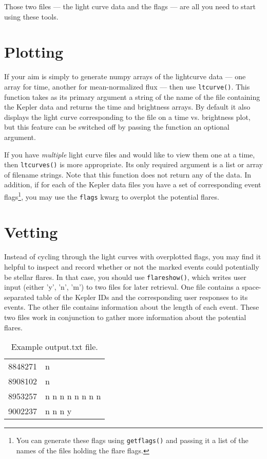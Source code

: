 \documentclass{article}
\begin{document}
Those two files --- the light curve data and the flags --- are all you
need to start using these tools.


\section{Plotting}
\label{sec:basic}

If your aim is simply to generate numpy arrays of the lightcurve data
--- one array for time, another for mean-normalized flux --- then use
\verb|ltcurve()|.  This function takes as its primary argument a
string of the name of the file containing the Kepler data and returns
the time and brightness arrays.  By default it also displays the light
curve corresponding to the file on a time vs. brightness plot, but
this feature can be switched off by passing the function an optional
argument.

If you have \emph{multiple} light curve files and would like to view
them one at a time, then \verb|ltcurves()| is more appropriate.  Its
only required argument is a list or array of filename strings.  Note
that this function does not return any of the data.  In addition, if
for each of the Kepler data files you have a set of corresponding
event flags\footnote{You can generate these flags using
  \texttt{getflags()} and passing it a list of the names of the files
  holding the flare flags.}, you may use the \verb|flags| kwarg to
overplot the potential flares.


\section{Vetting}
\label{sec:vet}

Instead of cycling through the light curves with overplotted flags,
you may find it helpful to inspect and record whether or not the
marked events could potentially be stellar flares.  In that case, you
should use \verb|flareshow()|, which writes user input (either 'y',
'n', 'm') to two files for later retrieval.  One file contains a
space-separated table of the Kepler IDs and the corresponding user
responses to its events.  The other file contains information about
the length of each event.  These two files work in conjunction to
gather more information about the potential flares.

\begin{table}[h]
  \centering
  \begin{tabular}{l l}

8848271 &  n \\
8908102 &  n \\
8953257 &  n  n  n  n  n  n  n  n \\
9002237 &  n  n  n  y \\
\end{tabular}
\caption{Example output.txt file.}
\end{table}
\end{document}
